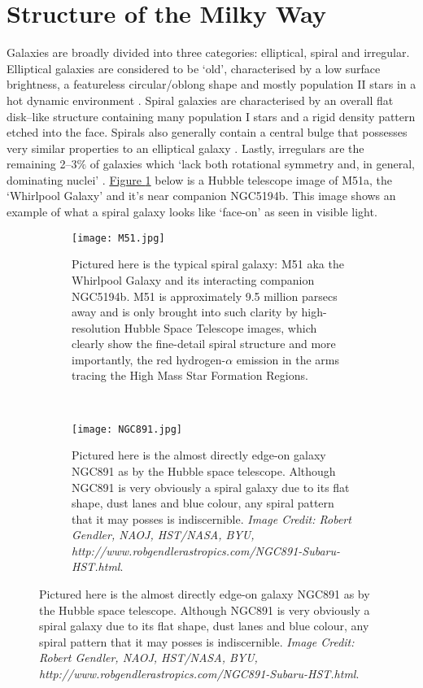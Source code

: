 	\section{Structure of the Milky Way}
		Galaxies are broadly divided into three categories: elliptical, spiral and irregular. Elliptical galaxies are considered to be `old', characterised by a low surface brightness, a featureless circular/oblong shape and mostly population II stars in a hot dynamic environment \citep[dominated by random radial motion;][]{Hubble1936}. Spiral galaxies are characterised by an overall flat disk--like structure containing many population I stars and a rigid density pattern etched into the face. Spirals also generally contain a central bulge that possesses very similar properties to an elliptical galaxy \citep{Merritt1999}. Lastly,  irregulars are the remaining 2--3$\%$ of galaxies which `lack both rotational symmetry and, in general, dominating nuclei' \citep{Hubble1936}. 
		\hyperref[fig:whirlpoolgalaxy]{Figure \ref*{fig:whirlpoolgalaxy}} below is a Hubble telescope image of M51a,  the `Whirlpool Galaxy' and it's near companion NGC5194b. This image shows an example of what a spiral galaxy looks like `face-on' as seen in visible light.
		\begin{figure}[h]
	    \centering
		    \begin{subfigure}[t]{0.42\textwidth}
				\centering
			    \texttt{[image: M51.jpg]}
			    \caption[M51, Whirlpool Galaxy]{Pictured here is the typical spiral galaxy: M51 aka the Whirlpool Galaxy and its interacting companion NGC5194b. M51 is approximately 9.5 million parsecs away and is only brought into such clarity by high-resolution Hubble Space Telescope images, which clearly show the fine-detail spiral structure and more importantly, the red hydrogen-$\alpha$ emission in the arms tracing the High Mass Star Formation Regions.}
			    \label{fig:whirlpoolgalaxy}
		    \end{subfigure}
		    ~
			\begin{subfigure}[t]{0.55\textwidth}
				\centering	
			    \texttt{[image: NGC891.jpg]}
			    \caption[NGC891]{Pictured here is the almost directly edge-on galaxy NGC891 as by the Hubble space telescope. Although NGC891 is very obviously a spiral galaxy due to its flat shape, dust lanes and blue colour, any spiral pattern that it may posses is indiscernible. {\it Image Credit: Robert Gendler, NAOJ, HST/NASA, BYU, http://www.robgendlerastropics.com/NGC891-Subaru-HST.html}.}
			    \label{fig:NGC891}
			\end{subfigure}
		\end{figure}
